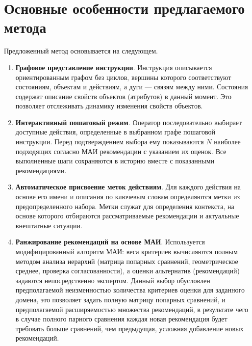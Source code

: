 \section{Основные особенности предлагаемого метода}

Предложенный метод основывается на следующем.

\begin{enumerate}
    \item \textbf{Графовое представление инструкции}. 
    Инструкция описывается ориентированным графом без циклов, вершины которого соответствуют состояниям, объектам и действиям, а дуги --- связям между ними.
    Состояния содержат описание свойств объектов (атрибутов) в данный момент. 
    Это позволяет отслеживать динамику изменения свойств объектов.
    
    \item \textbf{Интерактивный пошаговый режим}.
    Оператор последовательно выбирает доступные действия, определенные в выбранном графе пошаговой инструкции. 
    Перед подтверждением выбора ему показываются $N$ наиболее подходящих согласно МАИ рекомендации с указанием их оценок.
    Все выполненные шаги сохраняются в историю вместе с показанными рекомендациями.

    \item \textbf{Автоматическое присвоение меток действиям}. 
    Для каждого действия на основе его имени и описания по ключевым словам определяются метки из предопределенного набора. 
    Метки служат для определения контекста, на основе которого отбираются рассматриваемые рекомендации и актуальные внештатные ситуации.


    \item \textbf{Ранжирование рекомендаций на основе МАИ}.
    Используется модифицированный алгоритм МАИ: веса критериев вычисляются полным методом анализа иерархий (матрица попарных сравнений, геометрическое среднее, проверка согласованности), а оценки альтернатив (рекомендаций) задаются непосредственно экспертом. 
    Данный выбор обусловлен предполагаемой неизменностью количества критериев оценки для заданного домена, это позволяет задать полную матрицу попарных сравнений, и предполагаемой расширяемостью множества рекомендаций, в результате чего в случае полного парного сравнения каждая новая рекомендация будет требовать больше сравнений, чем предыдущая, усложняя добавление новых рекомендаций.


\end{enumerate}
